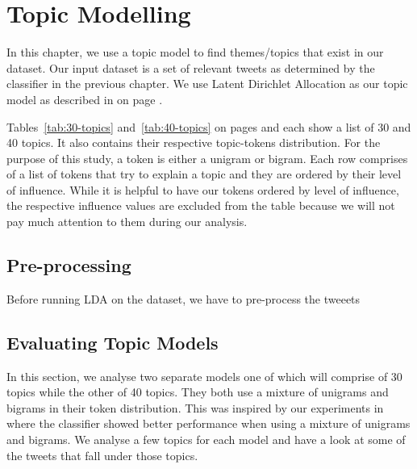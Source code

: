 \chapter{Topic Modelling}
\label{cha:topic-modelling}
In this chapter, we use a topic model to find themes/topics that exist in our dataset. Our input
dataset is a set of relevant tweets as determined by the classifier in the previous chapter. We use
Latent Dirichlet Allocation as our topic model as described in  on page
\pageref{sec:bg-lda}.

Tables~\ref{tab:30-topics} and~\ref{tab:40-topics} on pages \pageref{tab:30-topics} and
\pageref{tab:40-topics} each show a list of 30 and 40 topics. It also contains their respective
topic-tokens distribution. For the purpose of this study, a token is either a unigram or bigram.
Each row comprises of a list of tokens that try to explain a topic and they are ordered by their
level of influence. While it is helpful to have our tokens ordered by level of influence, the
respective influence values are excluded from the table because we will not pay much
attention to them during our analysis.


\section{Pre-processing}
\label{sec:lda-preprocessing}
Before running LDA on the dataset, we have to pre-process the tweeets

\section{Evaluating Topic Models}
\label{sec:evaluating-topic-models}
In this section, we analyse two separate models one of which will comprise of 30 topics while the
other of 40 topics. They both use a mixture of unigrams and bigrams in their token distribution.
This was inspired by our experiments in  where the classifier
showed better performance when using a mixture of unigrams and bigrams. We analyse a few topics for
each model and have a look at some of the tweets that fall under those topics.

